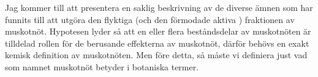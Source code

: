 

Jag kommer till att presentera en saklig beskrivning av de diverse ämnen som har funnits till att utgöra den flyktiga (och den förmodade aktiva \cite{shulgin1967chemistry}) fraktionen av muskotnöt. Hypotesen lyder så att en eller flera beståndsdelar av muskotnöten är tilldelad rollen för de berusande effekterna av muskotnöt, därför behövs en exakt kemisk definition av muskotnöten. Men före detta, så måste vi definiera just vad som namnet muskotnöt betyder i botaniska termer.










